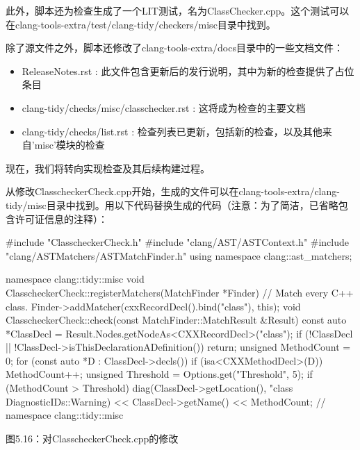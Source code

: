 此外，脚本还为检查生成了一个LIT测试，名为ClassChecker.cpp。这个测试可以在clang-tools-extra/test/clang-tidy/checkers/misc目录中找到。

除了源文件之外，脚本还修改了clang-tools-extra/docs目录中的一些文档文件：

\begin{itemize}
\item
ReleaseNotes.rst : 此文件包含更新后的发行说明，其中为新的检查提供了占位条目

\item
clang-tidy/checks/misc/classchecker.rst : 这将成为检查的主要文档

\item
clang-tidy/checks/list.rst : 检查列表已更新，包括新的检查，以及其他来自'misc'模块的检查
\end{itemize}

现在，我们将转向实现检查及其后续构建过程。


从修改ClasscheckerCheck.cpp开始，生成的文件可以在clang-tools-extra/clang-tidy/misc目录中找到。用以下代码替换生成的代码（注意：为了简洁，已省略包含许可证信息的注释）：

\begin{cpp}
#include "ClasscheckerCheck.h"
#include "clang/AST/ASTContext.h"
#include "clang/ASTMatchers/ASTMatchFinder.h"
using namespace clang::ast_matchers;

namespace clang::tidy::misc {
void ClasscheckerCheck::registerMatchers(MatchFinder *Finder) {
  // Match every C++ class.
  Finder->addMatcher(cxxRecordDecl().bind("class"), this);
}
void ClasscheckerCheck::check(const MatchFinder::MatchResult &Result) {
   const auto *ClassDecl = Result.Nodes.getNodeAs<CXXRecordDecl>("class");
   if (!ClassDecl || !ClassDecl->isThisDeclarationADefinition())
     return;
   unsigned MethodCount = 0;
   for (const auto *D : ClassDecl->decls()) {
     if (isa<CXXMethodDecl>(D))
       MethodCount++;
   }
   unsigned Threshold = Options.get("Threshold", 5);
   if (MethodCount > Threshold) {
     diag(ClassDecl->getLocation(),
       "class %
       DiagnosticIDs::Warning)
     << ClassDecl->getName() << MethodCount;
   }
  }
} // namespace clang::tidy::misc
\end{cpp}

\begin{center}
图5.16：对ClasscheckerCheck.cpp的修改
\end{center}

